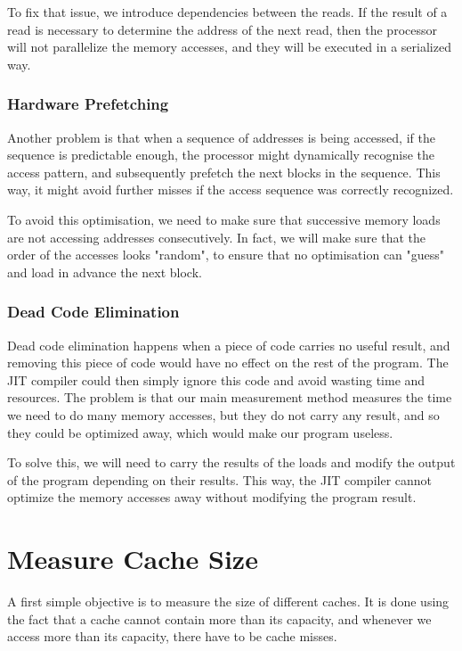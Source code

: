 \documentclass[a4paper,11pt,oneside]{report}
\begin{document}
To fix that issue, we introduce dependencies between the reads. If the result of a read is necessary to determine the address of the next read, then the processor will not parallelize the memory accesses, and they will be executed in a serialized way.

\subsubsection{Hardware Prefetching}

Another problem is that when a sequence of addresses is being accessed, if the sequence is predictable enough, the processor might dynamically recognise the access pattern, and subsequently prefetch the next blocks in the sequence. This way, it might avoid further misses if the access sequence was correctly recognized.

To avoid this optimisation, we need to make sure that successive memory loads are not accessing addresses consecutively. In fact, we will make sure that the order of the accesses looks "random", to ensure that no optimisation can "guess" and load in advance the next block.

\subsubsection{Dead Code Elimination}

Dead code elimination happens when a piece of code carries no useful result, and removing this piece of code would have no effect on the rest of the program. The JIT compiler could then simply ignore this code and avoid wasting time and resources. The problem is that our main measurement method measures the time we need to do many memory accesses, but they do not carry any result, and so they could be optimized away, which would make our program useless. 

To solve this, we will need to carry the results of the loads and modify the output of the program depending on their results. This way, the JIT compiler cannot optimize the memory accesses away without modifying the program result.

\section{Measure Cache Size}
\label{sec:measure_cache_size}
A first simple objective is to measure the size of different caches. It is done using the fact that a cache cannot contain more than its capacity, and whenever we access more than its capacity, there have to be cache misses. 
\end{document}

